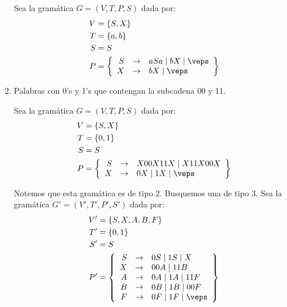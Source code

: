 \begin{ejercicio}
\begin{enumerate}
        Sea la gramática $G=\left(V,T,P,S\right)$ dada por:
        \begin{align*}
            V &= \{S, X\} \\
            T &= \{a,b\} \\
            S &= S \\
            P &= \left\{
                \begin{array}{rcl}
                    S &\rightarrow & aSa \mid bX \mid \veps \\
                    X &\rightarrow & bX \mid \veps \\
                \end{array}
            \right\}
        \end{align*}

        \item Palabras con 0's y 1's que contengan la subcadena 00 y 11.
        
        Sea la gramática $G=\left(V,T,P,S\right)$ dada por:
        \begin{align*}
            V &= \{S, X\} \\
            T &= \{0,1\} \\
            S &= S \\
            P &= \left\{
                \begin{array}{rcl}
                    S &\rightarrow & X00X11X \mid X11X00X \\
                    X &\rightarrow & 0X \mid 1X \mid \veps
                \end{array}
            \right\}
        \end{align*}

        Notemos que esta gramática es de tipo $2$. Busquemos una de tipo $3$.
        Sea la gramática $G'=\left(V',T',P',S'\right)$ dada por:
        \begin{align*}
            V' &= \{S, X, A, B, F\} \\
            T' &= \{0,1\} \\
            S' &= S \\
            P' &= \left\{
                \begin{array}{rcl}
                    S &\rightarrow & 0S \mid 1S \mid X\\
                    X &\rightarrow & 00A \mid 11B \\
                    A &\rightarrow & 0A \mid 1A \mid 11F \\
                    B &\rightarrow & 0B \mid 1B \mid 00F \\
                    F &\rightarrow & 0F \mid 1F \mid \veps
                \end{array}
            \right\}
        \end{align*}


\end{enumerate}
\end{ejercicio}
